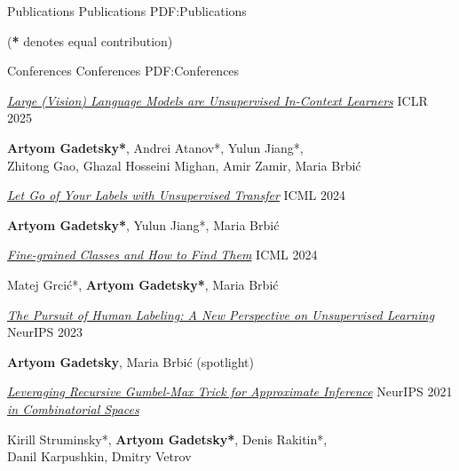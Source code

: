 \documentclass[letterpaper,MMMyyyy,nonstopmode]{simpleresumecv}
\begin{document}
\begin{Body}


\Section
{Publications}
{Publications}
{PDF:Publications}

\Entry
\hfill
(\textbf{*} denotes equal contribution)

\SubSection
{Conferences}
{Conferences}
{PDF:Conferences}
\Gap

\Entry
\href{https://openreview.net/forum?id=ohJxgRLlLt}{\textit{Large (Vision) Language Models are Unsupervised In-Context Learners}}
\hfill ICLR 2025
\begin{Detail}
\textbf{Artyom Gadetsky*}, Andrei Atanov*, Yulun Jiang*,\\ Zhitong Gao, Ghazal Hosseini Mighan, Amir Zamir, Maria Brbić
\end{Detail}
\Gap

\Entry
\href{https://proceedings.mlr.press/v235/gadetsky24a.html}{\textit{Let Go of Your Labels with Unsupervised Transfer}} \hfill ICML 2024
\begin{Detail}
\textbf{Artyom Gadetsky*}, Yulun Jiang*, Maria Brbić
\end{Detail}
\Gap

\Entry
\href{https://proceedings.mlr.press/v235/grcic24a.html}{\textit{Fine-grained Classes and How to Find Them}} \hfill ICML 2024
\begin{Detail}
Matej Grcić*, \textbf{Artyom Gadetsky*}, Maria Brbić
\end{Detail}
\Gap

\Entry
\href{https://proceedings.neurips.cc/paper_files/paper/2023/hash/be38c74290c251820e396680a82ce12d-Abstract-Conference.html}{\textit{The Pursuit of Human Labeling: A New Perspective on Unsupervised Learning}} \hfill NeurIPS 2023
\begin{Detail}
\textbf{Artyom Gadetsky}, Maria Brbić \hfill(spotlight)
\end{Detail}
\Gap

\Entry
\href{https://proceedings.neurips.cc/paper/2021/hash/5b658d2a925565f0755e035597f8d22f-Abstract.html}{\textit{Leveraging Recursive Gumbel-Max Trick for Approximate Inference}} \hfill NeurIPS 2021 \\ \href{https://proceedings.neurips.cc/paper/2021/hash/5b658d2a925565f0755e035597f8d22f-Abstract.html}{\textit{in Combinatorial Spaces}}
\begin{Detail}
Kirill Struminsky*, \textbf{Artyom Gadetsky*}, Denis Rakitin*, \\ Danil Karpushkin, Dmitry Vetrov
\end{Detail}
\Gap


\end{Body}
\end{document}
